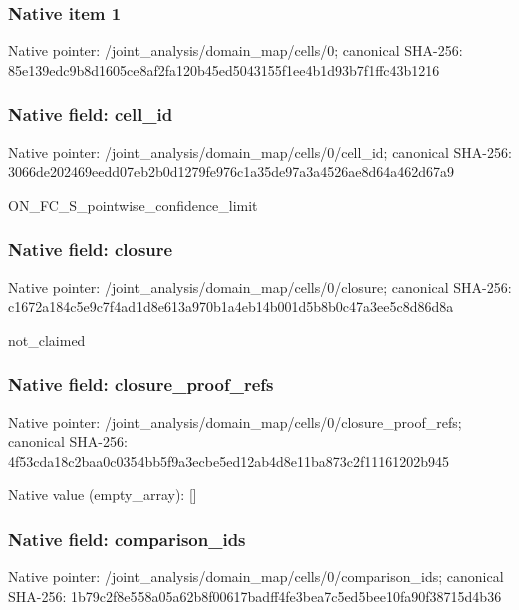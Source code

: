 \documentclass[10pt,a4paper]{article}
\begin{document}
\subsubsection{Native item 1}
Native pointer: /joint\_\allowbreak{}analysis/domain\_\allowbreak{}map/cells/0; canonical SHA-256: 85e139edc9b8d1605ce8af2fa120b45ed5043155f1ee4b1d93b7f1ffc43b1216

\subsubsection{Native field: cell\_\allowbreak{}id}
Native pointer: /joint\_\allowbreak{}analysis/domain\_\allowbreak{}map/cells/0/cell\_\allowbreak{}id; canonical SHA-256: 3066de202469eedd07eb2b0d1279fe976c1a35de97a3a4526ae8d64a462d67a9

\begingroup\raggedright\sloppy ON\_\allowbreak{}FC\_\allowbreak{}S\_\allowbreak{}pointwise\_\allowbreak{}confidence\_\allowbreak{}limit\par\endgroup

\subsubsection{Native field: closure}
Native pointer: /joint\_\allowbreak{}analysis/domain\_\allowbreak{}map/cells/0/closure; canonical SHA-256: c1672a184c5e9c7f4ad1d8e613a970b1a4eb14b001d5b8b0c47a3ee5c8d86d8a

\begingroup\raggedright\sloppy not\_\allowbreak{}claimed\par\endgroup

\subsubsection{Native field: closure\_\allowbreak{}proof\_\allowbreak{}refs}
Native pointer: /joint\_\allowbreak{}analysis/domain\_\allowbreak{}map/cells/0/closure\_\allowbreak{}proof\_\allowbreak{}refs; canonical SHA-256: 4f53cda18c2baa0c0354bb5f9a3ecbe5ed12ab4d8e11ba873c2f11161202b945

Native value (empty\_\allowbreak{}array): []

\subsubsection{Native field: comparison\_\allowbreak{}ids}
Native pointer: /joint\_\allowbreak{}analysis/domain\_\allowbreak{}map/cells/0/comparison\_\allowbreak{}ids; canonical SHA-256: 1b79c2f8e558a05a62b8f00617badff4fe3bea7c5ed5bee10fa90f38715d4b36
\end{document}
